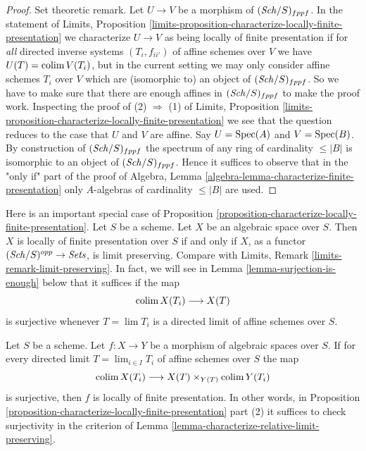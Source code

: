 \begin{proof}
\medskip\noindent
Set theoretic remark. Let $U \to V$ be a morphism of
$(\mathit{Sch}/S)_{fppf}$. In the statement of
Limits, Proposition
\ref{limits-proposition-characterize-locally-finite-presentation}
we characterize $U \to V$ as being locally of finite presentation
if for {\it all} directed inverse systems $(T_i, f_{ii'})$ of affine schemes
over $V$ we have $U(T) = \mathop{\mathrm{colim}}\nolimits V(T_i)$, but in the current setting
we may only consider affine schemes $T_i$ over $V$ which are (isomorphic to)
an object of $(\mathit{Sch}/S)_{fppf}$. So we have to make sure that there
are enough affines in $(\mathit{Sch}/S)_{fppf}$ to make the proof work.
Inspecting the proof of (2) $\Rightarrow$ (1) of
Limits, Proposition
\ref{limits-proposition-characterize-locally-finite-presentation}
we see that the question reduces to the case that $U$ and $V$ are affine.
Say $U = \mathop{\mathrm{Spec}}(A)$ and $V = \mathop{\mathrm{Spec}}(B)$. By construction
of $(\mathit{Sch}/S)_{fppf}$ the spectrum of any ring of cardinality
$\leq |B|$ is isomorphic to an object of $(\mathit{Sch}/S)_{fppf}$.
Hence it suffices to observe that in the "only if" part of the proof of
Algebra, Lemma \ref{algebra-lemma-characterize-finite-presentation}
only $A$-algebras of cardinality $\leq |B|$ are used.
\end{proof}

\begin{remark}
\label{remark-limit-preserving}
Here is an important special case of
Proposition \ref{proposition-characterize-locally-finite-presentation}.
Let $S$ be a scheme. Let $X$ be an algebraic space over $S$.
Then $X$ is locally of finite presentation over $S$ if and only
if $X$, as a functor $(\mathit{Sch}/S)^{opp} \to \textit{Sets}$,
is limit preserving. Compare with
Limits, Remark \ref{limits-remark-limit-preserving}.
In fact, we will see in Lemma \ref{lemma-surjection-is-enough}
below that it suffices if the map
$$
\mathop{\mathrm{colim}}\nolimits X(T_i) \longrightarrow X(T)
$$
is surjective whenever $T = \lim T_i$ is a directed limit of
affine schemes over $S$.
\end{remark}

\begin{lemma}
\label{lemma-surjection-is-enough}
Let $S$ be a scheme.
Let $f : X \to Y$ be a morphism of algebraic spaces over $S$.
If for every directed limit $T = \lim_{i \in I} T_i$
of affine schemes over $S$ the map
$$
\mathop{\mathrm{colim}}\nolimits X(T_i) \longrightarrow X(T) \times_{Y(T)} \mathop{\mathrm{colim}}\nolimits Y(T_i)
$$
is surjective, then $f$ is locally of finite presentation.
In other words, in
Proposition \ref{proposition-characterize-locally-finite-presentation}
part (2) it suffices to check surjectivity in the criterion of
Lemma \ref{lemma-characterize-relative-limit-preserving}.
\end{lemma}


